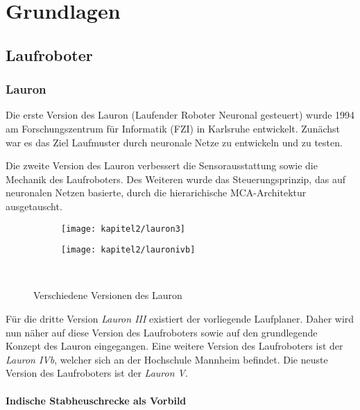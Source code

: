 \chapter{Grundlagen}
\label{kap2}

\section{Laufroboter}

\subsection{Lauron}

Die erste Version des Lauron (Laufender Roboter Neuronal gesteuert) wurde 1994 am Forschungszentrum für Informatik (FZI) in Karlsruhe \autocite{fzi} entwickelt. Zunächst war es das Ziel Laufmuster durch neuronale Netze zu entwickeln und zu testen.

Die zweite Version des Lauron verbessert die Sensorausstattung sowie die Mechanik des Laufroboters. Des Weiteren wurde das Steuerungsprinzip, das auf neuronalen Netzen basierte, durch die hierarichische MCA-Architektur \autocite{scholl2001modular} ausgetauscht. 

\begin{figure}[b!]
  \centering
  \begin{subfigure}[b]{.4\linewidth}
    \centering
    \texttt{[image: kapitel2/lauron3]}
    \label{kap2:lauron3}
  \end{subfigure}%
  \qquad
  \begin{subfigure}[b]{.4\linewidth}
    \centering
    \texttt{[image: kapitel2/lauronivb]}
    \label{kap2:lauron4b}
  \end{subfigure}\\
  \caption{Verschiedene Versionen des Lauron}
  \label{kap2lauron}
\end{figure}

Für die dritte Version \emph{Lauron III} existiert der vorliegende Laufplaner. Daher wird nun näher auf diese Version des Laufroboters sowie auf den grundlegende Konzept des Lauron eingegangen. Eine weitere Version des Laufroboters ist der \emph{Lauron IVb}, welcher sich an der Hochschule Mannheim befindet. Die neuste Version des Laufroboters ist der \emph{Lauron V}.

\subsubsection{Indische Stabheuschrecke als Vorbild}


